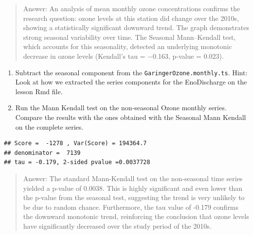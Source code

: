 \documentclass[
]{article}
\newenvironment{Shaded}{\begin{snugshade}}{\end{snugshade}}
\newcommand{\CommentTok}[1]{\textcolor[rgb]{0.56,0.35,0.01}{\textit{#1}}}
\newcommand{\FunctionTok}[1]{\textcolor[rgb]{0.13,0.29,0.53}{\textbf{#1}}}
\newcommand{\NormalTok}[1]{#1}
\newcommand{\OtherTok}[1]{\textcolor[rgb]{0.56,0.35,0.01}{#1}}
\newcommand{\SpecialCharTok}[1]{\textcolor[rgb]{0.81,0.36,0.00}{\textbf{#1}}}
\newcommand{\StringTok}[1]{\textcolor[rgb]{0.31,0.60,0.02}{#1}}
\begin{document}
\begin{quote}
Answer: An analysis of mean monthly ozone concentrations confirms the
research question: ozone levels at this station did change over the
2010s, showing a statistically significant downward trend. The graph
demonstrates strong seasonal variability over time. The Seasonal
Mann--Kendall test, which accounts for this seasonality, detected an
underlying monotonic decrease in ozone levels (Kendall's tau = −0.163,
p-value = 0.023).
\end{quote}

\begin{enumerate}
\def\labelenumi{\arabic{enumi}.}
\setcounter{enumi}{14}
\item
  Subtract the seasonal component from the
  \texttt{GaringerOzone.monthly.ts}. Hint: Look at how we extracted the
  series components for the EnoDischarge on the lesson Rmd file.
\item
  Run the Mann Kendall test on the non-seasonal Ozone monthly series.
  Compare the results with the ones obtained with the Seasonal Mann
  Kendall on the complete series.
\end{enumerate}

\begin{Shaded}
\end{Shaded}

\begin{verbatim}
## Score =  -1278 , Var(Score) = 194364.7
## denominator =  7139
## tau = -0.179, 2-sided pvalue =0.0037728
\end{verbatim}

\begin{quote}
Answer: The standard Mann-Kendall test on the non-seasonal time series
yielded a p-value of 0.0038. This is highly significant and even lower
than the p-value from the seasonal test, suggesting the trend is very
unlikely to be due to random chance. Furthermore, the tau value of
-0.179 confirms the downward monotonic trend, reinforcing the conclusion
that ozone levels have significantly decreased over the study period of
the 2010s.
\end{quote}
\end{document}
